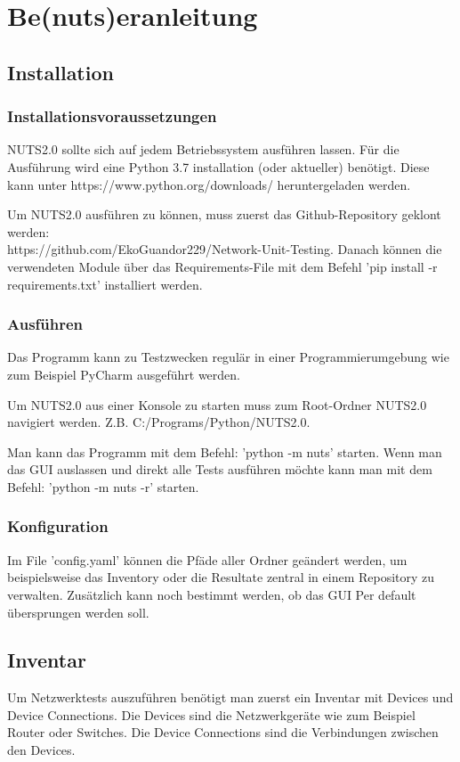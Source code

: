 \documentclass[]{subfiles}
\begin{document}
\section{Be(nuts)eranleitung}
\subsection{Installation}
	\subsubsection{Installationsvoraussetzungen}
	NUTS2.0 sollte sich auf jedem Betriebssystem ausführen lassen.
	Für die Ausführung wird eine Python 3.7 installation (oder aktueller) benötigt.
	Diese kann unter https://www.python.org/downloads/ heruntergeladen werden.

	Um NUTS2.0 ausführen zu können, muss zuerst das Github-Repository geklont werden:\\
	https://github.com/EkoGuandor229/Network-Unit-Testing. 
	Danach können die verwendeten Module über das Requirements-File mit dem Befehl
	'pip install -r requirements.txt' installiert werden.

	\subsubsection{Ausführen}
	Das Programm kann zu Testzwecken regulär in einer Programmierumgebung 
	wie zum Beispiel PyCharm ausgeführt werden.

	Um NUTS2.0 aus einer Konsole zu starten muss zum Root-Ordner NUTS2.0 navigiert werden. 
	Z.B. C:/Programs/Python/NUTS2.0.

	Man kann das Programm mit dem Befehl: 'python -m nuts' starten. 
	Wenn man das GUI auslassen und direkt alle Tests ausführen möchte kann
	man mit dem Befehl: 'python -m nuts -r' starten.

	\subsubsection{Konfiguration}
	Im File 'config.yaml' können die Pfäde aller Ordner geändert werden, um beispielsweise
	das Inventory oder die Resultate zentral in einem Repository zu verwalten. 
	Zusätzlich kann noch bestimmt werden, ob das GUI Per default übersprungen werden soll.

	\newpage

\subsection{Inventar}
	Um Netzwerktests auszuführen benötigt man zuerst ein Inventar mit Devices und 
	Device Connections.
	Die Devices sind die Netzwerkgeräte wie zum Beispiel Router oder Switches.
	Die Device Connections sind die Verbindungen zwischen den Devices.
\end{document}
